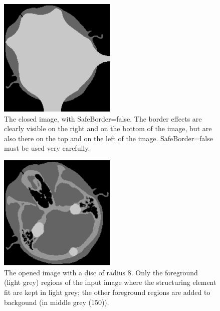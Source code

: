 \documentclass[IJ]{cesj}
\begin{document}
\begin{figure}
\centering
\includegraphics[width=0.5\textwidth]{close-unsafe.eps}
\caption{The closed image, with SafeBorder=false. The border effects are clearly visible on the right and on the bottom of the image, but are also there on the top and on the left of the image. SafeBorder=false must be used very carefully.\label{unsafe}}
\end{figure}

\begin{figure}
\centering
\includegraphics[width=0.5\textwidth]{open.eps}
\caption{The opened image with a disc of radius 8. Only the foreground (light grey) regions of the input image where the structuring element fit are kept in light grey; the other foreground regions are added to backgound (in middle grey (150)).\label{open}}
\end{figure}
\end{document}
